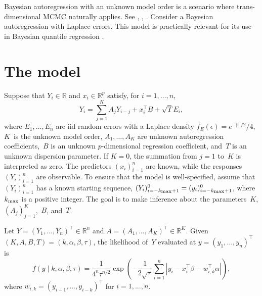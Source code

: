 \documentclass[12pt]{article}
\begin{document}

Bayesian autoregression with an unknown model order is a scenario where trans-dimensional MCMC naturally applies.
See \cite{troughton1998reversible}, \cite{ehlers2002efficient}, \cite{vermaak2004reversible}.
Consider a Bayesian autoregression with Laplace errors.
This model is practically relevant for its use in Bayesian quantile regression \citep{yu2001bayesian}.


\section{The model}




Suppose that $Y_i \in \mathbb{R}$ and $x_i \in \mathbb{R}^p$ satisfy, for $i = 1, \dots, n$, 
\[
Y_i = \sum_{j=1}^K A_j Y_{i-j} + x_i^{\top} B + \sqrt{T} E_i,
\]
where $E_1, \dots, E_n$ are iid random errors with a Laplace density $f_E(\epsilon) = e^{-|\epsilon|/2}/4$, $K$~is the unknown model order, $A_1, \dots, A_K$ are unknown autoregression coefficients,~$B$ is an unknown $p$-dimensional regression coefficient, and~$T$ is an unknown dispersion parameter.
If $K = 0$, the summation from $j = 1$ to~$K$ is interpreted as zero.
The predictors $(x_i)_{i=1}^n$ are known, while the responses $(Y_i)_{i=1}^n$ are observable.
To ensure that the model is well-specified, assume that $(Y_i)_{i=1}^n$ has a known starting sequence, $(Y_i)_{i=-k_{\scriptsize \mbox{max}} + 1}^0 = (y_i)_{i=-k_{\scriptsize \mbox{max}} + 1}^0$, where $k_{\scriptsize \mbox{max}}$ is a positive integer.
The goal is to make inference about the parameters~$K$, $(A_j)_{j=1}^K$,~$B$, and~$T$.





Let $Y = (Y_1, \dots, Y_n)^{\top} \in \mathbb{R}^n$ and $A = (A_1, \dots, A_K)^{\top} \in \mathbb{R}^K$.
Given $(K,A,B,T) = (k,\alpha, \beta, \tau)$, the likelihood of~$Y$ evaluated at $y = (y_1, \dots, y_n)^{\top}$ is
\[
f(y \mid k, \alpha, \beta, \tau) = \frac{1}{4^n \tau^{n/2}} \exp \left( - \frac{1}{2\sqrt{\tau}} \sum_{i=1}^n \left|y_i - x_i^{\top} \beta - w_{i,k}^{\top} \alpha \right| \right),
\] 
where  $w_{i,k} = (y_{i-1}, \dots, y_{i-k})^{\top}$ for $i = 1,\dots,n$.
\end{document}

